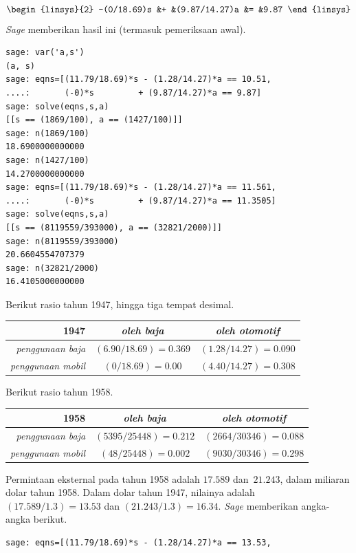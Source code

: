 \begin{exercises}
\begin{answer}
\begin{exparts}
\begin{equation*}
\begin{linsys}{2}
	       -(0/18.69)s   &+   &(9.87/14.27)a &= &9.87
	    \end{linsys}
	  \end{equation*}
          \textit{Sage} memberikan hasil ini (termasuk pemeriksaan awal).
\begin{lstlisting}
sage: var('a,s')
(a, s)
sage: eqns=[(11.79/18.69)*s - (1.28/14.27)*a == 10.51,
....:       (-0)*s         + (9.87/14.27)*a == 9.87]
sage: solve(eqns,s,a)
[[s == (1869/100), a == (1427/100)]]
sage: n(1869/100)
18.6900000000000
sage: n(1427/100)
14.2700000000000
sage: eqns=[(11.79/18.69)*s - (1.28/14.27)*a == 11.561,
....:       (-0)*s         + (9.87/14.27)*a == 11.3505]
sage: solve(eqns,s,a)
[[s == (8119559/393000), a == (32821/2000)]]
sage: n(8119559/393000)
20.6604554707379
sage: n(32821/2000)
16.4105000000000            
\end{lstlisting}
	\partsitem
          Berikut rasio tahun 1947, hingga tiga tempat desimal.
	  \begin{center}
            \begin{tabular}{r|cc}
               1947   &\textit{oleh baja}  &\textit{oleh otomotif}  \\ \hline
               \textit{penggunaan baja}  &$(6.90/18.69)=0.369$ &$(1.28/14.27)=0.090$  \\
               \textit{penggunaan mobil}  &$(0/18.69)=0.00$ &$(4.40/14.27)=0.308$
            \end{tabular}
          \end{center}
          Berikut rasio tahun 1958.
          \begin{center}
            \begin{tabular}{r|cc}
               1958           &\textit{oleh baja}  &\textit{oleh otomotif}  \\ \hline
               \textit{penggunaan baja}  &$(5395/25448)=0.212$ &$(2664/30346)=0.088$  \\
               \textit{penggunaan mobil}  &$(48/25448)=0.002$ &$(9030/30346)=0.298$
            \end{tabular}
          \end{center}
	\partsitem
          Permintaan eksternal pada tahun 1958 adalah $17.589$ dan~$21.243$,
          dalam miliaran dolar tahun 1958.
          Dalam dolar tahun 1947, nilainya adalah $(17.589/1.3)=13.53$ dan
          $(21.243/1.3)=16.34$.
          \textit{Sage} memberikan angka-angka berikut.
\begin{lstlisting}
sage: eqns=[(11.79/18.69)*s - (1.28/14.27)*a == 13.53,

\end{lstlisting}
\end{exparts}
\end{answer}
\end{exercises}
